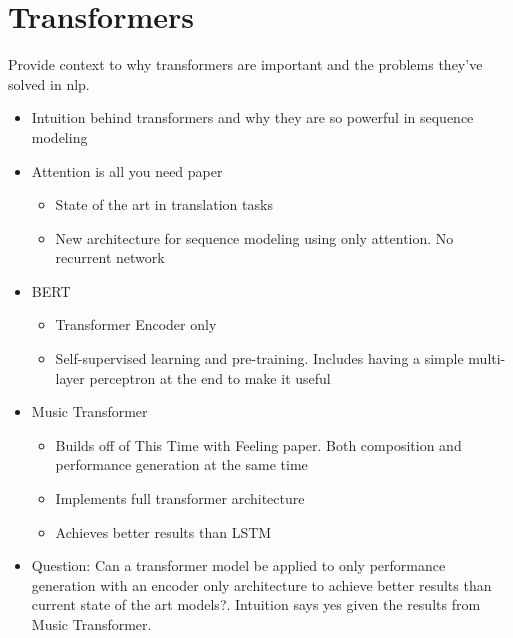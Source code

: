 \section{Transformers}
Provide context to why transformers are important and the problems they've solved in nlp. 
\begin{itemize}
    \item Intuition behind transformers and why they are so powerful in sequence modeling
    \item Attention is all you need paper \cite{vaswani2017attention}
    \begin{itemize}
        \item State of the art in translation tasks
        \item New architecture for sequence modeling using only attention. No recurrent network
    \end{itemize}
    \item BERT \cite{devlin2018bert}
    \begin{itemize}
        \item Transformer Encoder only 
        \item Self-supervised learning and pre-training. Includes having a simple multi-layer perceptron at the end to make it useful
    \end{itemize}
    \item Music Transformer \cite{huang2018music}
    \begin{itemize}
        \item Builds off of This Time with Feeling\cite{oore2020time} paper. Both composition and performance generation at the same time 
        \item Implements full transformer architecture 
        \item Achieves better results than LSTM
    \end{itemize}
    \item Question: Can a transformer model be applied to only performance generation with an encoder only architecture to achieve better results than current state of the art models?. Intuition says yes given the results from Music Transformer. 
\end{itemize}



